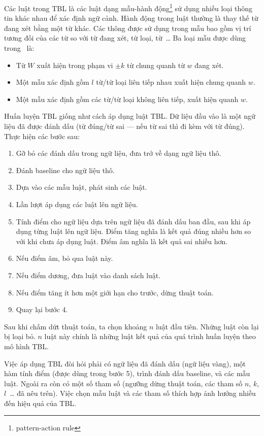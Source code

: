 \documentclass[a4paper,oneside,14pt]{extbook} %
\begin{document}
Các luật trong TBL là các luật dạng mẫu-hành
động\footnote{pattern-action rule} sử dụng nhiều loại thông tin khác
nhau để xác định ngữ cảnh. Hành động trong luật thường là thay thế
từ đang xét bằng một từ khác. Các thông được sử dụng trong mẫu bao gồm
vị trí tương đối của các từ so với từ đang xét, từ loại, từ~\ldots{} Ba
loại mẫu được dùng trong~\cite{tbl} là:
\begin{itemize}
\item Từ $W$ xuất hiện trong phạm vi $\pm k$ từ chung quanh từ $w$
  đang xét.
\item Một mẫu xác định gồm $l$ từ/từ loại liên tiếp nhau xuất hiện
  chung quanh $w$.
\item Một mẫu xác định gồm các từ/từ loại không liên tiếp, xuất hiện
  quanh $w$.
\end{itemize}

Huấn luyện TBL giống như cách áp dụng luật TBL. Dữ liệu đầu vào là một
ngữ liệu đã được đánh dấu (từ đúng/từ sai --- nếu từ sai thì đi kèm
với từ đúng). Thực hiện các bước sau:
\begin{enumerate}
\item Gỡ bỏ các đánh dấu trong ngữ liệu, đưa trở về dạng ngữ liệu thô.
\item Đánh baseline cho ngữ liệu thô.
\item Dựa vào các mẫu luật, phát sinh các luật. 
\item Lần lượt áp dụng các luật lên ngữ liệu. 
\item Tính điểm cho ngữ liệu dựa trên ngữ liệu đã đánh dấu ban đầu,
  sau khi áp dụng từng luật lên ngữ   liệu. Điểm tăng nghĩa là kết quả
  đúng nhiều hơn so với khi chưa áp   dụng luật. Điểm âm nghĩa là kết
  quả sai nhiều hơn. 
\item Nếu điểm âm, bỏ qua luật này.
\item Nếu điểm dương, đưa luật vào danh sách luật.
\item Nếu điểm tăng ít hơn một giới hạn cho trước, dừng thuật toán.
\item Quay lại bước 4.
\end{enumerate}

Sau khi chấm dứt thuật toán, ta chọn khoảng $n$ luật đầu tiên. Những
luật còn lại bị loại bỏ. $n$ luật này chính là những luật kết quả của
quá trình huấn luyện theo mô hình TBL.

Việc áp dụng TBL đòi hỏi phải có ngữ liệu đã đánh dấu (ngữ liệu vàng),
một hàm tính điểm (được dùng trong bước 5), trình đánh dấu baseline,
và các mẫu luật. Ngoài ra còn có một số tham số (ngưỡng dừng thuật
toán, các tham số $n$, $k$, $l$~\ldots{} đã nêu trên). Việc chọn mẫu
luật và các tham số thích hợp ảnh hưởng nhiều đến hiệu quả của TBL.
\end{document}
